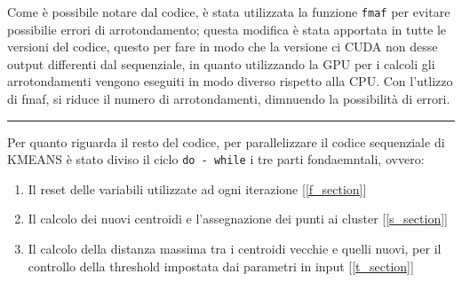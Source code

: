 \documentclass{article}
\begin{document}
  Come è possibile notare dal codice, è stata utilizzata la funzione \verb|fmaf| per evitare possibilie errori
  di arrotondamento; questa modifica è stata apportata in tutte le versioni del codice, questo per fare 
  in modo che la versione ci CUDA non desse output differenti dal sequenziale, in quanto utilizzando la GPU per i calcoli 
  gli arrotondamenti vengono eseguiti in modo diverso rispetto alla CPU. Con l'utlizzo di fmaf, si riduce il numero di arrotondamenti,
  dimnuendo la possibilità di errori.
  \begin{center}
    \rule{6cm}{1pt}
  \end{center}
  Per quanto riguarda il resto del codice, per parallelizzare il codice sequenziale di KMEANS è stato diviso il ciclo \verb|do - while| i tre parti
  fondaemntali, ovvero: 
  \begin{enumerate}
    \item Il reset delle variabili utilizzate ad ogni iterazione [\ref{f_section}]
    \item Il calcolo dei nuovi centroidi e l'assegnazione dei punti ai cluster [\ref{s_section}]
    \item Il calcolo della distanza massima tra i centroidi vecchie e quelli nuovi, per il controllo della threshold impostata dai parametri in input [\ref{t_section}]
  \end{enumerate}
\end{document}
